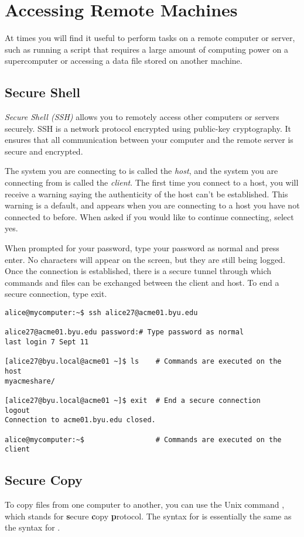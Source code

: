 \section*{Accessing Remote Machines} %
At times you will find it useful to perform tasks on a remote computer or server, such as running a script that requires a large amount of computing power on a supercomputer or accessing a data file stored on another machine.

\subsection*{Secure Shell}
\emph{Secure Shell (SSH)} allows you to remotely access other computers or servers securely.
SSH is a network protocol encrypted using public-key cryptography. 
It ensures that all communication between your computer and the remote server is secure and encrypted.

The system you are connecting to is called the \emph{host}, and the system you are connecting from is called the \emph{client}.
The first time you connect to a host, you will receive a warning saying the authenticity of the host can't be established. 
This warning is a default, and appears when you are connecting to a host you have not connected to before. 
When asked if you would like to continue connecting, select yes.

When prompted for your password, type your password as normal and press enter.
No characters will appear on the screen, but they are still being logged.
Once the connection is established, there is a secure tunnel through which commands and files can be exchanged between the client and host.
To end a secure connection, type exit.

\begin{lstlisting}
alice@mycomputer:~$ ssh alice27@acme01.byu.edu	

alice27@acme01.byu.edu password:# Type password as normal
last login 7 Sept 11
					
[alice27@byu.local@acme01 ~]$ ls	# Commands are executed on the host
myacmeshare/
	
[alice27@byu.local@acme01 ~]$ exit	# End a secure connection		
logout
Connection to acme01.byu.edu closed.

alice@mycomputer:~$					# Commands are executed on the client
\end{lstlisting}

\subsection*{Secure Copy} %
To copy files from one computer to another, you can use the Unix command , which stands for \textbf{s}ecure \textbf{c}opy \textbf{p}rotocol.
The syntax for  is essentially the same as the syntax for .

